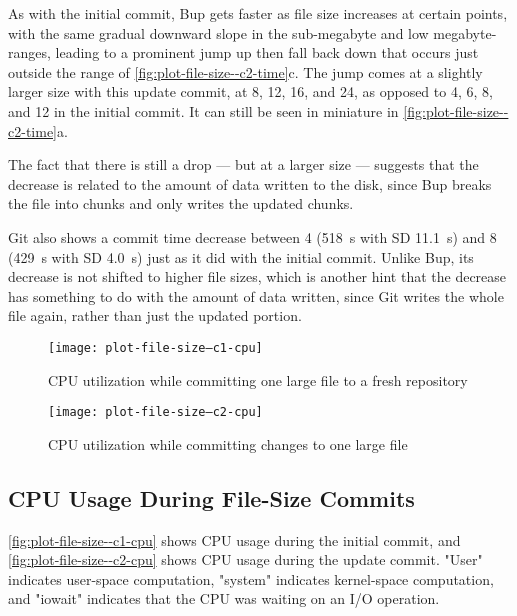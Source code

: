 As with the initial commit, Bup gets faster as file size increases at certain
points, with the same gradual downward slope in the sub-megabyte and low
megabyte-ranges, leading to a prominent jump up then fall back down that occurs
just outside the range of \autoref{fig:plot-file-size--c2-time}c. The jump comes
at a slightly larger size with this update commit, at \num{8}, \num{12},
\num{16}, and \SI{24}{\mib}, as opposed to \num{4}, \num{6}, \num{8}, and
\SI{12}{\mib} in the initial commit. It can still be seen in miniature in
\autoref{fig:plot-file-size--c2-time}a.

The fact that there is still a drop --- but at a larger size --- suggests that
the decrease is related to the amount of data written to the disk, since Bup
breaks the file into chunks and only writes the updated chunks.

Git also shows a commit time decrease between \SI{4}{\gib} (\SI{518}{\s} with SD
\SI{11.1}{\s}) and \SI{8}{\gib} (\SI{429}{\s} with SD \SI{4.0}{\s}) just as it
did with the initial commit. Unlike Bup, its decrease is not shifted to higher
file sizes, which is another hint that the decrease has something to do with the
amount of data written, since Git writes the whole file again, rather than just
the updated portion.

%


\begin{figure}[p]
    \caption{CPU utilization while committing one large file to a fresh repository}
    \label{fig:plot-file-size--c1-cpu}
    \centering
    \texttt{[image: plot-file-size--c1-cpu]}
\end{figure}

\begin{figure}[p]
    \caption{CPU utilization while committing changes to one large file}
    \label{fig:plot-file-size--c2-cpu}
    \centering
    \texttt{[image: plot-file-size--c2-cpu]}
\end{figure}

\cleardoublepage

\subsection{CPU Usage During File-Size Commits}

\autoref{fig:plot-file-size--c1-cpu} shows CPU usage during the initial
\gls{commit}, and \autoref{fig:plot-file-size--c2-cpu} shows CPU usage during
the update commit. "User" indicates user-space computation, "system" indicates
kernel-space computation, and "iowait" indicates that the CPU was waiting on an
I/O operation.

